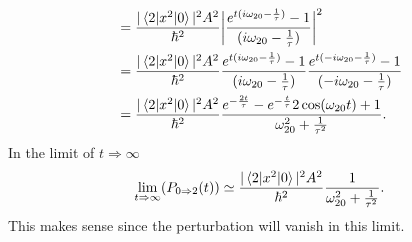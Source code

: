 \begin{example}
\begin{equation}
\begin{split}
			&=\frac{|\braket{2|x^2|0}|^2A^2}{\hbar^2}\bigg|\frac{e^{t(i\omega_{20}-\frac{1}{\tau})}-1}{(i\omega_{20}-\frac{1}{\tau})}\bigg|^2\\
			&=\frac{|\braket{2|x^2|0}|^2A^2}{\hbar^2}\frac{e^{t(i\omega_{20}-\frac{1}{\tau})}-1}{(i\omega_{20}-\frac{1}{\tau})}\frac{e^{t(-i\omega_{20}-\frac{1}{\tau})}-1}{(-i\omega_{20}-\frac{1}{\tau})}\\
			&=\frac{|\braket{2|x^2|0}|^2A^2}{\hbar^2}\frac{e^{-\frac{2t}{\tau}}-e^{-\frac{t}{\tau}}2\cos(\omega_{20}t)+1}{\omega_{20}^2+\frac{1}{\tau^2}}.\\
		\end{split}
	\end{equation} 
	In the limit of $t\Rightarrow \infty$
	\begin{equation}
		\lim\limits_{t\Rightarrow\infty}(P_{0\Rightarrow 2}(t))\simeq\frac{|\braket{2|x^2|0}|^2A^2}{\hbar^2}\frac{1}{\omega_{20}^2+\frac{1}{\tau^2}}.
	\end{equation} 
	This makes sense since the perturbation will vanish in this limit.
\end{example}



